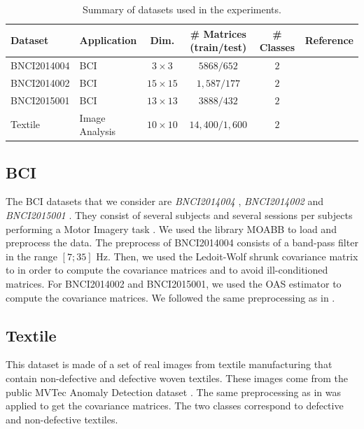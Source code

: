 \documentclass[10pt]{article} %
\theoremstyle{plain}
\theoremstyle{definition}
\theoremstyle{remark}
\begin{document}
\begin{table}[ht]
  \centering
  \small
  \setlength{\tabcolsep}{6pt}
  \begin{tabular}{l l c c c l}
    \toprule
    \textbf{Dataset}
    & \textbf{Application}
    & \textbf{Dim.}
    & \textbf{\# Matrices (train/test)}
    & \textbf{\# Classes}
    & \textbf{Reference} \\
    \midrule
    BNCI2014004
    & BCI
    & $3 \times 3$
    & $5868 / 652$
    & $2$
    & \citep{Leebbcidataset} \\

    BNCI2014002
    & BCI
    & $15 \times 15$
    & $1{,}587 / 177$
    & $2$
    & \citep{SteyrlSchererFallerMüllerPutz+2016+77+86} \\

    BNCI2015001
    & BCI
    & $13 \times 13$
    & $3888 / 432$
    & $2$
    & \cite{faller} \\

    Textile
    & Image Analysis
    & $10 \times 10$
    & $14{,}400 / 1{,}600$
    & $2$
    & \cite{MVTec2021} \\
    \bottomrule
  \end{tabular}
  \caption{Summary of datasets used in the experiments.}
  \label{tab:datasets_summary}
\end{table}
\subsection*{BCI}
The BCI datasets that we consider are \emph{BNCI2014004} \citep{Leebbcidataset}, \emph{BNCI2014002} \citep{SteyrlSchererFallerMüllerPutz+2016+77+86} and \emph{BNCI2015001} \citep{faller}. They consist of several subjects and several sessions per subjects performing a Motor Imagery task \cite{motor_imagery}. We used the library MOABB \cite{Aristimunha_Mother_of_all} to load and preprocess the data. The preprocess of BNCI2014004 consists of a band-pass filter in the range $[7;35]$ Hz. Then, we used the Ledoit-Wolf shrunk covariance matrix \citep{ledoitWellconditionedEstimatorLargedimensional2004} to in order to compute the covariance matrices and to avoid ill-conditioned matrices. For BNCI2014002 and BNCI2015001, we used the OAS estimator \citep{chen2010shrinkage} to compute the covariance matrices. We followed the same preprocessing as in \citet{collasRiemannianFlowMatching2025}.

\subsection*{Textile}
This dataset is made of a set of real images from textile manufacturing that contain non-defective and defective woven textiles. These images come from the public MVTec Anomaly Detection dataset \cite{MVTec2021}. The same preprocessing as in \citet{smithDataAnalysisUsing2022} was applied to get the covariance matrices. The two classes correspond to defective and non-defective textiles.
\end{document}
